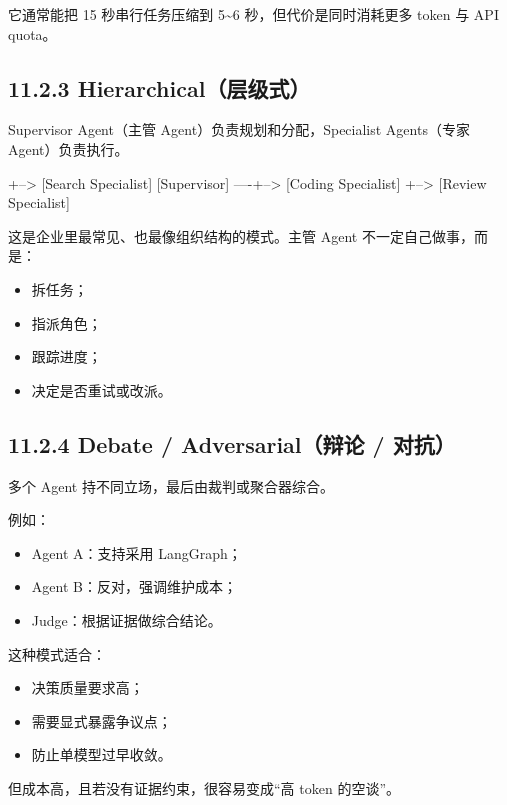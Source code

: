 它通常能把 15 秒串行任务压缩到 5\textasciitilde{}6 秒，但代价是同时消耗更多 token 与 API quota。


\subsection{11.2.3 Hierarchical（层级式）}

Supervisor Agent（主管 Agent）负责规划和分配，Specialist Agents（专家 Agent）负责执行。


\begin{codeblock}
                 +--> [Search Specialist]
[Supervisor] ----+--> [Coding Specialist]
                 +--> [Review Specialist]
\end{codeblock}

这是企业里最常见、也最像组织结构的模式。主管 Agent 不一定自己做事，而是：


\begin{itemize}[leftmargin=2em]
\item 拆任务；
\item 指派角色；
\item 跟踪进度；
\item 决定是否重试或改派。
\end{itemize}

\subsection{11.2.4 Debate / Adversarial（辩论 / 对抗）}

多个 Agent 持不同立场，最后由裁判或聚合器综合。


例如：


\begin{itemize}[leftmargin=2em]
\item Agent A：支持采用 LangGraph；
\item Agent B：反对，强调维护成本；
\item Judge：根据证据做综合结论。
\end{itemize}

这种模式适合：


\begin{itemize}[leftmargin=2em]
\item 决策质量要求高；
\item 需要显式暴露争议点；
\item 防止单模型过早收敛。
\end{itemize}

但成本高，且若没有证据约束，很容易变成``高 token 的空谈''。


